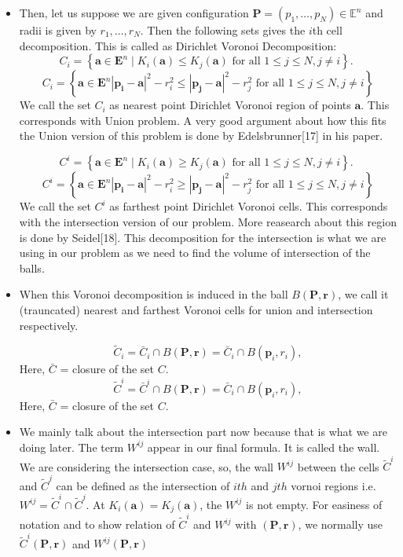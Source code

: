 \begin{itemize}
\item Then, let us suppose we are given configuration $ \mathbf{P}=(p_1, \dots ,p_N) \in  \mathbb{E}^n$ and radii is given by $r_1, \dots, r_N$. Then the following sets gives the  $i$th cell decomposition. This is called as Dirichlet Voronoi Decomposition:\\ 
$$
C_{i}=\left\{\mathbf{a} \in \mathbf{E}^{n} \mid K_{i}(\mathbf{a})\leq K_{j}(\mathbf{a}) \text { for all } 1 \leq j \leq N, j \neq i\right\} \text {. }
$$
$$
C_{i}=\left\{\mathbf{a} \in \mathbf{E}^{n} \left|\mathbf{p}_{\mathbf{i}}-\mathbf{a}\right|^{2}-r_{i}^{2}\leq \left|\mathbf{p}_{\mathbf{j}}-\mathbf{a}\right|^{2}-r_{j}^{2}  \text { for all } 1 \leq j \leq N, j \neq i\right\}
$$
We call the set $C_{i}$ as nearest point Dirichlet Voronoi region of points $\mathbf{a}$. This corresponds with Union  problem. A very good argument about how this fits the Union version of this problem is done by Edelsbrunner[17] in his paper.  




$$
C^{i}=\left\{\mathbf{a} \in \mathbf{E}^{n} \mid K_{i}(\mathbf{a}) \geq K_{j}(\mathbf{a}) \text { for all } 1 \leq j \leq N, j \neq i\right\} \text {. }
$$
$$
C^{i}=\left\{\mathbf{a} \in \mathbf{E}^{n} \left|\mathbf{p}_{\mathbf{i}}-\mathbf{a}\right|^{2}-r_{i}^{2} \geq \left|\mathbf{p}_{\mathbf{j}}-\mathbf{a}\right|^{2}-r_{j}^{2} \text { for all } 1 \leq j \leq N, j \neq i\right\}
$$
We call the set $C^{i} $ as farthest point Dirichlet Voronoi cells. This corresponds with the intersection version of our problem. More  reasearch about this region is done by Seidel[18]. This decomposition for the intersection is what we are using in our problem as we need to find the volume of intersection of the balls. 

\item When this Voronoi decomposition is induced in the ball $B(\mathbf{P}, \mathbf{r})$, we call it  (trauncated) nearest and farthest Voronoi cells for union and intersection respectively.

$$
\tilde{C}_{i}=\bar{C}_{i} \cap B(\mathbf{P}, \mathbf{r})=\bar{C}_{i} \cap B\left(\mathbf{p}_{i}, r_{i}\right),
$$
Here, $\bar{C}$ = closure of the set $C$.
$$
\tilde{C}^{i}=\bar{C}^{i} \cap B(\mathbf{P}, \mathbf{r})=\bar{C}_{i} \cap B\left(\mathbf{p}_{i}, r_{i}\right),
$$
Here, $\bar{C}$ = closure of the set $C$.




\item We mainly talk about the intersection part now because that is what we are doing later.  The term  $W^{i j}$ appear in our final formula. It is called the wall. We are considering the intersection case, so, the wall $W^{i j}$ between the cells $\tilde{C}^{i}$ and $\tilde{C}^{j}$  can be defined as the intersection of $ith$ and $jth $ vornoi regions i.e. $W^{i j}=\tilde{C}^{i} \cap \tilde{C}^{j}$. At $K_{i}(\mathbf{a})=K_{j}(\mathbf{a})$, the $W^{i j}$ is not empty. 
For easiness of notation and to show  relation of $\tilde{C}^{i}$ and $W^{i j}$ with $(\mathbf{P}, \mathbf{r})$, we normally use $\tilde{C}^{i}(\mathbf{P}, \mathbf{r})$ and $W^{i j}(\mathbf{P}, \mathbf{r})$



\end{itemize}

